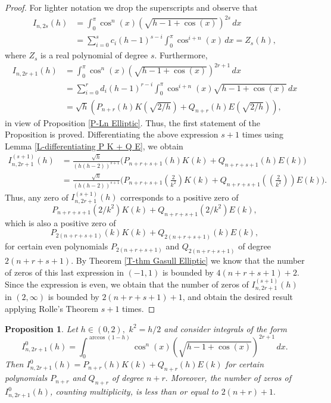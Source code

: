 \documentclass[12pt,psamsfonts]{amsart}
\newtheorem {proposition} [theorem]{Proposition}
\begin{document}
\begin{proof}
For lighter notation we drop the superscripts and observe that
\begin{align*}
    I_{n,2s}(h) &= \int_0^{\pi}\cos^n(x) \left(\sqrt{h-1+\cos(x)}\right)^{2s} \, dx \\
                    &= \sum_{i=0}^s c_i (h-1)^{s-i} \int_0^{\pi} \cos^{i+n}(x) \, dx=Z_s(h),
\end{align*}
where $Z_s$ is a real polynomial of degree $s$. Furthermore,
\begin{align*}
    I_{n,2r+1}(h) &= \int_0^{\pi}\cos^n(x) \left(\sqrt{h-1+\cos(x)}\right)^{2r+1} \, dx \\
                        &= \sum_{i=0}^r d_i (h-1)^{r-i} \int_0^{\pi}
                        \cos^{i+n}(x)\sqrt{h-1+\cos(x)} \, dx\\
                        &= \sqrt{h} \left(P_{n+r}(h) K\left(\sqrt{{2}/{h}}\right)+
                         Q_{n+r}(h) E\left(\sqrt{{2}/{h}}\right)\right),
\end{align*}
in view of Proposition \ref{P-Ln Elliptic}. Thus, the first statement
of the Proposition is proved. Differentiating the above expression $s+1$ times using
Lemma \ref{L-differentiating P K + Q E}, we obtain
$$ \begin{array}{ll}
I_{n,2r+1}^{(s+1)}(h)&=\frac{\sqrt{h}}{(h(h-2))^{s+1}}\big(P_{n+r+s+1}(h) K(k)
+ Q_{n+r+s+1}(h) E(k)\big)\\ &=
\frac{\sqrt{h}}{(h(h-2))^{s+1}}\big(P_{n+r+s+1}(\frac{2}{k^2}) K(k)
+ Q_{n+r+s+1}((\frac{2}{k^2})) E(k)\big).
\end{array}$$
Thus, any zero of $I_{n,2r+1}^{(s+1)}(h)$ corresponds to a positive zero of
$$ P_{n+r+s+1}\left({2}/{k^2}\right) K(k) + Q_{n+r+s+1}\left({2}/{k^2}\right)
E(k),$$
which is also a positive zero of
$$P_{2(n+r+s+1)}(k) K(k) + Q_{2(n+r+s+1)}(k)E(k),$$
for certain even polynomials  $P_{2(n+r+s+1)}$ and $Q_{2(n+r+s+1)}$ of degree $2(n+r+s+1).$
By Theorem \ref{T-thm Gasull Elliptic} we know that the number of
zeros of this last expression in $(-1,1)$ is bounded by $4(n+r+s+1)
+2.$ Since the expression is even, we obtain that the number of
zeros of $I_{n,2r+1}^{(s+1)}(h)$ in $(2,\infty)$ is bounded by $2(n+r+s+1) +1$,
and obtain the desired result applying Rolle's Theorem $s+1$ times.
\end{proof}

\begin{proposition}
\label{P bound inside}
 Let $h\in(0,2),\,\,k^2={h}/{2}$
 and consider integrals of the form
 \begin{equation*}
         I_{n,2r+1}^0 (h) = \int_0^{\arccos(1-h)} \cos^n(x)
         \left(\sqrt{h-1+\cos(x)}\right)^{2r+1} \, dx.
 \end{equation*}
 Then  $I_{n,2r+1}^0 (h)=P_{n+r}(h) K(k)+ Q_{n+r}(h) E(k)$ for
 certain polynomials $P_{n+r}$ and $Q_{n+r}$ of degree $n+r.$
 Moreover, the number of zeros of
 $I_{n,2r+1}^0 (h)$, counting multiplicity, is less than or equal to
$2(n+r)+1.$
\end{proposition}
\end{document}
